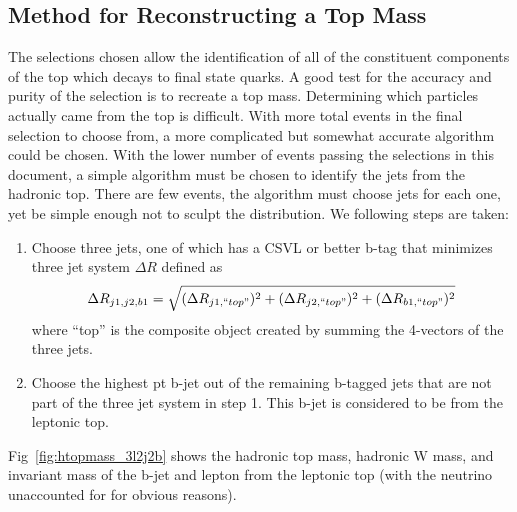 	
	\subsection{Method for Reconstructing a Top Mass}
	The selections chosen allow the identification of all of the constituent components of the top which decays to final state quarks. A good test for the accuracy and purity of the selection is to recreate a top mass. Determining which  particles actually came from the top is difficult. With more total events in the final selection to choose from, a more complicated but somewhat accurate algorithm could be chosen. With the lower number of events passing the selections in this document, a simple algorithm must be chosen to identify the jets from the hadronic top. There are few events, the algorithm must choose jets for each one, yet be simple enough not to sculpt the distribution. We following steps are taken:
\begin{enumerate}
\item Choose three jets, one of which has a CSVL or better b-tag that minimizes three jet system $\Delta R$ defined as
\begin{equation}
\Delta R_{j1,j2,b1} = \sqrt{ (\Delta R_{j1, ``top"}) ^2 + (\Delta R_{j2, ``top"}) ^2 + (\Delta R_{b1, ``top"}) ^2 }
\end{equation}
where ``top'' is the composite object created by summing the 4-vectors of the three jets.
\item Choose the highest pt b-jet out of the remaining b-tagged jets that are not part of the three jet system in step 1. This b-jet is considered to be from the leptonic top.
\end{enumerate}

Fig~\ref{fig:htopmass_3l2j2b} shows the hadronic top mass, hadronic W mass, and invariant mass of the b-jet and lepton from the leptonic top (with the neutrino unaccounted for for obvious reasons).


